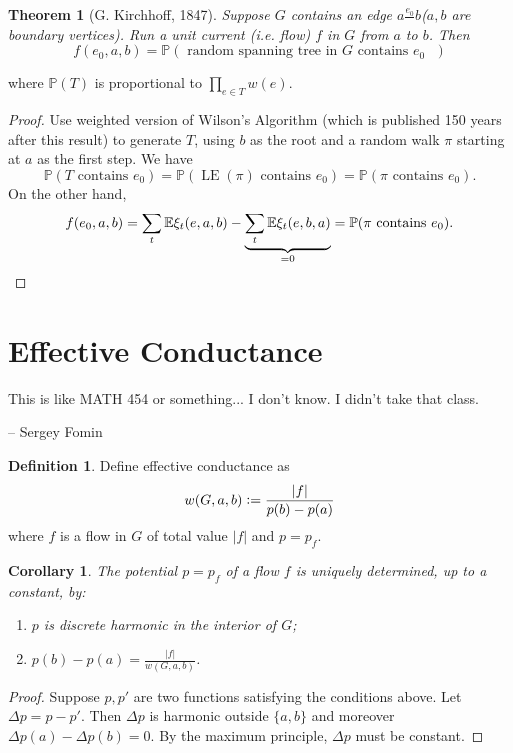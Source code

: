 \documentclass{report}
\newcommand{\matP}{\mathbb{P}}
\newcommand{\matE}{\mathbb{E}}
\def \LE {\operatorname{LE}}
\newcommand{\defeq}{\vcentcolon=}
\newtheorem{theorem}{Theorem}[section]
\newtheorem{corollary}{Corollary}[section]
\theoremstyle{definition}
\newtheorem{definition}{Definition}[section]
\theoremstyle{remark}
\numberwithin{equation}{section}
\begin{document}


\begin{theorem}[G. Kirchhoff, 1847]\label{thm:spanningtree}
    Suppose $G$ contains an edge $a \frac{e_0}{} b$($a, b$ are boundary vertices). Run a unit current (i.e. flow) $f$ in $G$ from $a$ to $b$. Then \[f(e_0, a, b) = \matP\left(\text{ random spanning tree in $G$ contains $e_0$ }\right)\]
\end{theorem} where $\matP(T)$ is proportional to $\prod_{e \in T} w(e)$.



\begin{proof}
    Use weighted version of Wilson's Algorithm (which is published 150 years after this result) to generate $T$, using $b$ as the root and a random walk $\pi$ starting at $a$ as the first step. We have
    \[
        \matP(T \text{ contains } e_0) = \matP(\LE(\pi) \text{ contains } e_0) = \matP(\pi \text{ contains } e_0).
    \] On the other hand,
    \[
        f(e_0, a, b) = \sum_t \matE\xi_t(e, a, b) - \underbrace{\sum_t \matE\xi_t(e, b, a)}_{= 0} = \matP(\pi \text{ contains } e_0). \qedhere
    \]
\end{proof}

\section{Effective Conductance}
\epigraph{This is like MATH 454 or something... I don't know. I didn't take that class.}{-- \textup{Sergey Fomin}}
\begin{definition}
    Define effective conductance as
    \[
    w(G, a, b) \defeq \frac{|f|}{p(b) - p(a)}    
    \] where $f$ is a flow in $G$ of total value $|f|$ and $p = p_f$.
\end{definition}

\begin{corollary}
    The potential $p = p_f$ of a flow $f$ is uniquely determined, up to a constant, by:
    \begin{enumerate}
        \item $p$ is discrete harmonic in the interior of $G$;
        \item $\displaystyle p(b) - p(a) = \frac{|f|}{w(G, a, b)}$.
    \end{enumerate}
\end{corollary}
\begin{proof}
    Suppose $p, p'$ are two functions satisfying the conditions above. Let $\Delta p = p - p'$. Then $\Delta p$ is harmonic outside $\{a, b\}$ and moreover $\Delta p(a) - \Delta p(b) = 0$. By the maximum principle, $\Delta p$ must be constant.
\end{proof}
\end{document}
